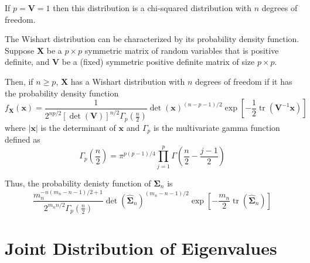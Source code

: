 \begin{remark}
    If $p=\mathbf{V}=1$ then this distribution is a chi-squared distribution with $n$ degrees of freedom.
\end{remark}

The Wishart distribution can be characterized by its probability density function. Suppose $\mathbf{X}$ be a $p\times p$ symmetric matrix of random variables that is positive definite, and $\mathbf{V}$ be a (fixed) symmetric positive definite matrix of size $p\times p$.

Then, if $n\geq p$, $\mathbf{X}$ has a Wishart distribution with $n$ degrees of freedom if it has the probability density function
\begin{equation}
    f_{\mathbf{X}}(\mathbf{x})=\frac{1}{2^{np/2}\left[\operatorname{det}\left(\mathbf{V}\right)\right]^{n/2}\Gamma_{p}\left(\frac{n}{2}\right)}\operatorname{det}\left(\mathbf{x}\right)^{(n-p-1)/2}\exp\left[-\frac{1}{2}\operatorname{tr}\left(\mathbf{V}^{-1}\mathbf{x}\right)\right]
\end{equation}
where $|\mathbf{x}|$ is the determinant of $\mathbf{x}$ and $\Gamma_{p}$ is the multivariate gamma function defined as
\begin{equation*}
    \Gamma_{p}\left(\frac{n}{2}\right)=\pi^{p(p-1)/4}\prod_{j=1}^{p}\Gamma\left(\frac{n}{2}-\frac{j-1}{2}\right)
\end{equation*}

Thus, the probability denisty function of $\widehat{\boldsymbol{\Sigma}}_{n}$ is
\begin{equation}
    \frac{m_{n}^{-n(m_{n}-n-1)/2+1}}{2^{m_{n}n/2}\Gamma_{p}\left(\frac{n}{2}\right)}\operatorname{det}\left(\widehat{\boldsymbol{\Sigma}}_{n}\right)^{(m_{n}-n-1)/2}\exp\left[-\frac{m_{n}}{2}\operatorname{tr}\left(\widehat{\boldsymbol{\Sigma}}_{n}\right)\right]
\end{equation}

\section{Joint Distribution of Eigenvalues}

